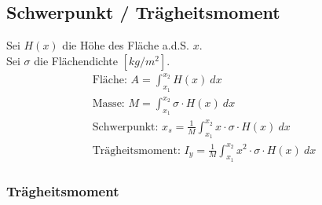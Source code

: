 \subsection{Schwerpunkt / Trägheitsmoment}
    Sei $H(x)$ die Höhe des Fläche a.d.S. $x$.\\
    Sei $\sigma$ die Flächendichte $[kg/m^2]$.
    \begin{align*}
        \textrm{Fläche: }  A = \int_{x_1}^{x_2} H(x)\ dx\\
        \textrm{Masse: }  M = \int_{x_1}^{x_2} \sigma \cdot H(x)\ dx\\
        \textrm{Schwerpunkt: }  x_s = \frac{1}{M} \int_{x_1}^{x_2} x \cdot \sigma \cdot H(x)\ dx\\
        \textrm{Trägheitsmoment: }  I_y = \frac{1}{M} \int_{x_1}^{x_2} x^2 \cdot \sigma \cdot H(x)\ dx
    \end{align*}
    \subsubsection{Trägheitsmoment}
        \vspace*{0.5em}
